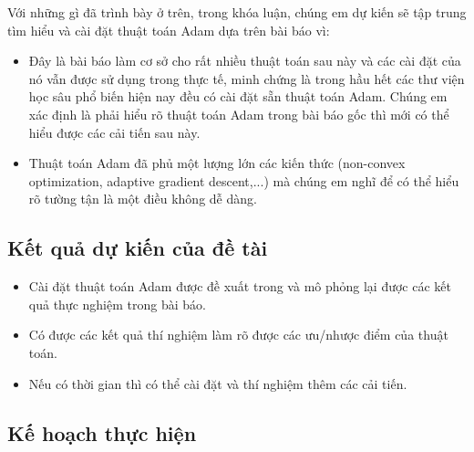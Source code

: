 \documentclass{article}[14pt]
\begin{document}
{\begin{itemize}
    \end{itemize}
    Với những gì đã trình bày ở trên, trong khóa luận, chúng em dự kiến sẽ tập trung tìm hiểu và cài đặt thuật toán Adam dựa trên bài báo \cite{Kingma2015AdamAM} vì:
    \begin{itemize}
        \item Đây là bài báo làm cơ sở cho rất nhiều thuật toán sau này và các cài đặt của nó vẫn được sử dụng trong thực tế, minh chứng là trong hầu hết các thư viện học sâu phổ biến hiện nay đều có cài đặt sẵn thuật toán Adam. Chúng em xác định là phải hiểu rõ thuật toán Adam trong bài báo gốc thì mới có thể hiểu được các cải tiến sau này.
        \item Thuật toán Adam đã phủ một lượng lớn các kiến thức (non-convex optimization, adaptive gradient descent,...) mà chúng em nghĩ để có thể hiểu rõ tường tận là một điều không dễ dàng.
    \end{itemize}
    
    \subsection{Kết quả dự kiến của đề tài}
        
    \begin{itemize}
        \item Cài đặt thuật toán Adam được đề xuất trong  \cite{Kingma2015AdamAM} và mô phỏng lại được các kết quả thực nghiệm trong bài báo.
        \item Có được các kết quả thí nghiệm làm rõ được các ưu/nhược điểm của thuật toán.
        \item Nếu có thời gian thì có thể cài đặt và thí nghiệm thêm các cải tiến.
    \end{itemize}
    
    \subsection{Kế hoạch thực hiện}
    
}
\end{document}
